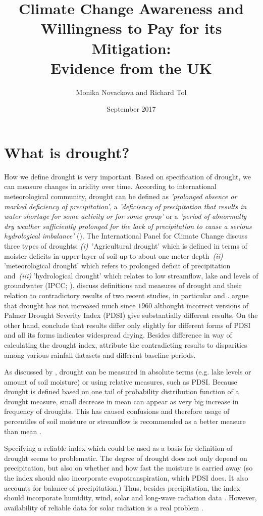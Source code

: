 \documentclass[a4paper,12pt]{article}
\date{\normalsize{September 2017}}
\title{\Large \bf Climate Change Awareness and Willingness to Pay for its Mitigation: \\ Evidence from the UK}
\author{Monika Novackova and Richard Tol}
\affil{\small{Department of Economics, University of Sussex, Falmer, UK}}
\begin{document}
\sloppy
\section*{What is drought?}
How we define drought is very important. Based on specification of drought, we can measure changes in aridity over time. According to international meteorological community, drought can be defined as \textit{ 'prolonged absence or marked deficiency of precipitation'}, a \textit{'deficiency of precipitation that results in water shortage for some activity or for some group'} or a \textit{'period of abnormally dry weather sufficiently prolonged for the lack of precipitation to cause a serious hydrological imbalance'} (\citealp{IPCCtrenberth, Heim2002}). The International Panel for Climate Change discuss three types of droughts: \textit{(i)}~'Agricultural drought' which is defined in terms of moister deficits in upper layer of soil up to about one meter depth~\textit{(ii)} 'meteorological drought' which refers to prolonged deficit of precipitation and~\textit{(iii)} 'hydrological drought' which relates to low streamflow, lake and levels of groundwater (IPCC; \citealp{IPCCtrenberth, Heim2002}). \cite{Trenberth2014} discuss definitions and measures of drought and their relation to contradictory results of two recent studies, in particular \cite{Sheffield2012} and \cite{Dai2011}. \cite{Sheffield2012} argue that drought has not increased much since $1960$ althought incorrect versions of Palmer Drought Severity Index (PDSI) give substantially different results. On the other hand, \cite{Dai2011} conclude that results differ only slightly for different forms of PDSI and all its forms indicates widespread drying. Besides difference in way of calculating the drought index, \cite{Trenberth2014} attribute the contradicting results to disparities among various rainfall datasets and different baseline periods.   

As discussed by \cite{Trenberth2014}, drought can be measured in absolute terms (e.g. lake levels or amount of soil moisture) or using relative measures, such as PDSI. Because drought is defined based on one tail of probability distribution function of a drought measure, small decrease in mean can appear as very big increase in frequency of droughts. This has caused confusions and therefore usage of percentiles of soil moisture or streamflow is recommended as a better measure than mean \citep{Trenberth2014}.

Specifying a reliable index which could be used as a basis for definition of drought seems to problematic. The degree of drought does not only depend on precipitation, but also on whether and how fast the moisture is carried away (so the index should also incorporate evapotranspiration, which PDSI does. It also accounts for balance of precipitation.) Thus, besides precipitation, the index should incorporate humidity, wind, solar and long-wave radiation data \citep{vanderSchrier2011}.  However, availability of reliable data for solar radiation is a real problem \citep{Wang2012}.
\end{document}
